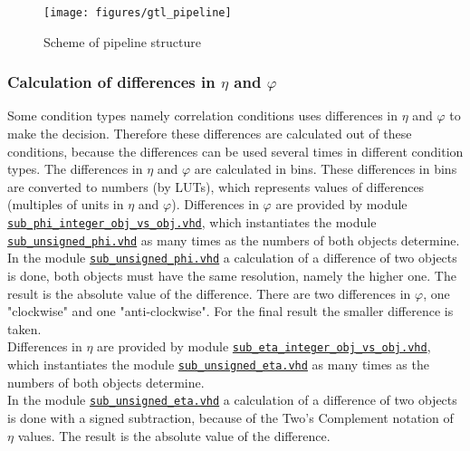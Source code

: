 \begin{figure}[htb]
\centering
\texttt{[image: figures/gtl\_pipeline]}
\caption{Scheme of \ugtl pipeline structure} 
\label{fig:gtl:gtl_pipeline}
\end{figure}

\subsubsection{Calculation of differences in $\eta$ and $\varphi$}
\label{sec:gtl:calculation_differences}

Some condition types namely correlation conditions uses differences in $\eta$ and $\varphi$ to make the decision.
Therefore these differences are calculated out of these conditions, because the differences can be used several times in different condition types.
The differences in $\eta$ and $\varphi$ are calculated in bins. These differences in bins are converted to numbers (by LUTs),
which represents values of differences (multiples of units in $\eta$ and $\varphi$).
Differences in $\varphi$ are provided by module \href{https://github.com/cms-l1-globaltrigger/mp7_ugt_legacy/tree/master/firmware/hdl/gt_mp7_core/gtl_fdl_wrapper/gtl/sub_phi_integer_obj_vs_obj.vhd}{\texttt{sub\_phi\_integer\_obj\_vs\_obj.vhd}}, which instantiates the module \href{https://github.com/cms-l1-globaltrigger/mp7_ugt_legacy/tree/master/firmware/hdl/gt_mp7_core/gtl_fdl_wrapper/gtl/sub_unsigned_phi.vhd}{\texttt{sub\_unsigned\_phi.vhd}} as many times as
the numbers of both objects determine.\\
In the module \href{https://github.com/cms-l1-globaltrigger/mp7_ugt_legacy/tree/master/firmware/hdl/gt_mp7_core/gtl_fdl_wrapper/gtl/sub_unsigned_phi.vhd}{\texttt{sub\_unsigned\_phi.vhd}} a calculation of a difference of two objects is done, both objects must have the same resolution, namely the higher one.
The result is the absolute value of the difference.
There are two differences in $\varphi$, one "clockwise" and one "anti-clockwise". For the final result the smaller difference is taken.\\
Differences in $\eta$ are provided by module \href{https://github.com/cms-l1-globaltrigger/mp7_ugt_legacy/tree/master/firmware/hdl/gt_mp7_core/gtl_fdl_wrapper/gtl/sub_eta_integer_obj_vs_obj.vhd}{\texttt{sub\_eta\_integer\_obj\_vs\_obj.vhd}}, which instantiates the module \href{https://github.com/cms-l1-globaltrigger/mp7_ugt_legacy/tree/master/firmware/hdl/gt_mp7_core/gtl_fdl_wrapper/gtl/sub_unsigned_eta.vhd}{\texttt{sub\_unsigned\_eta.vhd}} as many times as the numbers of both objects determine.\\
In the module \href{https://github.com/cms-l1-globaltrigger/mp7_ugt_legacy/tree/master/firmware/hdl/gt_mp7_core/gtl_fdl_wrapper/gtl/sub_unsigned_eta.vhd}{\texttt{sub\_unsigned\_eta.vhd}} a calculation of a difference of two objects is done with a signed subtraction, because of the Two's Complement notation of $\eta$ values.
The result is the absolute value of the difference. 

